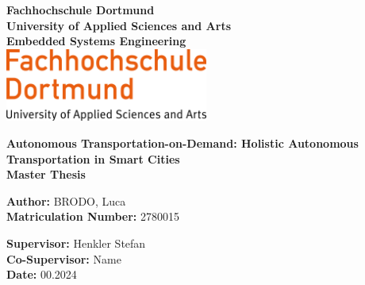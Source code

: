 

\begin{titlepage}
    \centering
    \vspace*{0.5cm}
    \Large
    \textbf{Fachhochschule Dortmund} \\
    \textbf{University of Applied Sciences and Arts} \\
    \textbf{Embedded Systems Engineering}\\
	\centering
	\vspace{1cm}
	\includegraphics[width=0.5\textwidth]{assets/img/01_title/FH_Dortmund-logo.svg.png}

    \vspace{2cm}

    \LARGE
    \textbf{Autonomous Transportation-on-Demand: Holistic Autonomous Transportation in Smart Cities} \\
     \vspace{1cm}
    \textbf{Master Thesis}

    \vspace{1cm}

    \large
    \textbf{Author:} \hspace{0.5cm} BRODO, Luca\\
    \textbf{Matriculation Number:} \hspace{0.5cm} 2780015

    \vspace{1cm}


    
   

    \textbf{Supervisor:} \hspace{0.5cm} Henkler Stefan \\
    \textbf{Co-Supervisor:} \hspace{0.5cm} Name \\
    \textbf{Date:} \hspace{0.5cm} 00.2024

    \vfill
    \vspace{1cm}

\end{titlepage}

